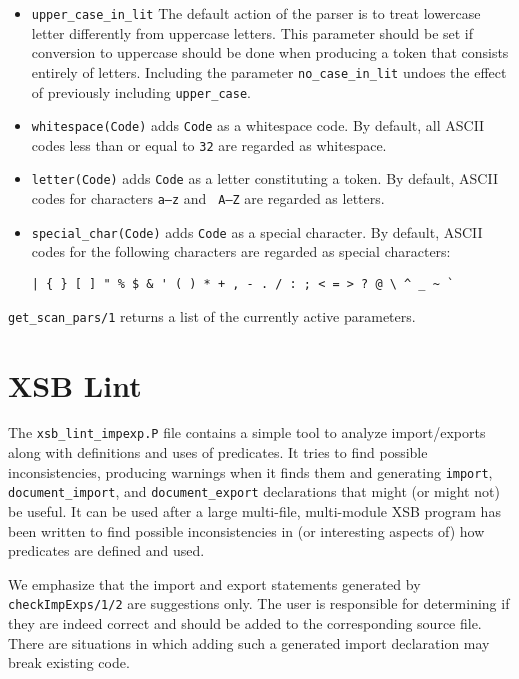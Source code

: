 \begin{description}
\begin{itemize}
\item{{\tt upper\_case\_in\_lit}} The default action of the parser is
to treat lowercase letter differently from uppercase letters.  This
parameter should be set if conversion to uppercase should be done when
producing a token that consists entirely of letters.  Including the
parameter {\tt no\_case\_in\_lit} undoes the effect of previously
including {\tt upper\_case}.

\item{{\tt whitespace(Code)}} adds {\tt Code} as a whitespace code.
By default, all ASCII codes less than or equal to {\tt 32} are
regarded as whitespace.

\item{{\tt letter(Code)}} adds {\tt Code} as a letter constituting a
token. By default, ASCII codes for characters {\tt a--z} and {\tt
A--Z} are regarded as letters.

\item{{\tt special\_char(Code)}} adds {\tt Code} as a special
  character.  By default, ASCII codes for the following characters are
  regarded as special characters:

\begin{verbatim}
| { } [ ] " % $ & ' ( ) * + , - . / : ; < = > ? @ \ ^ _ ~ `
\end{verbatim}
\end{itemize}

%
{\tt get\_scan\_pars/1} returns a list of the currently active
parameters.

\end{description} 

\section{XSB Lint}

The {\tt xsb\_lint\_impexp.P} file contains a simple tool to analyze
import/exports along with definitions and uses of predicates.  It
tries to find possible inconsistencies, producing warnings when it
finds them and generating {\tt import}, {\tt document\_import}, and
{\tt document\_export} declarations that might (or might not) be
useful.  It can be used after a large multi-file, multi-module XSB
program has been written to find possible inconsistencies in (or
interesting aspects of) how predicates are defined and used.

We emphasize that the import and export statements generated by {\tt
  checkImpExps/1/2} are suggestions only.  The user is responsible for
determining if they are indeed correct and should be added to the
corresponding source file.  There are situations in which adding such
a generated import declaration may break existing code.

